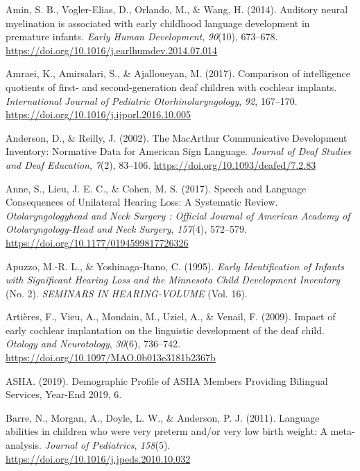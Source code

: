 \documentclass[english,man]{apa6}
\begin{document}
\leavevmode\hypertarget{ref-amin2014}{}%
Amin, S. B., Vogler-Elias, D., Orlando, M., \& Wang, H. (2014). Auditory neural myelination is associated with early childhood language development in premature infants. \emph{Early Human Development}, \emph{90}(10), 673--678. \url{https://doi.org/10.1016/j.earlhumdev.2014.07.014}

\leavevmode\hypertarget{ref-amraei2017}{}%
Amraei, K., Amirsalari, S., \& Ajalloueyan, M. (2017). Comparison of intelligence quotients of first- and second-generation deaf children with cochlear implants. \emph{International Journal of Pediatric Otorhinolaryngology}, \emph{92}, 167--170. \url{https://doi.org/10.1016/j.ijporl.2016.10.005}

\leavevmode\hypertarget{ref-anderson2002}{}%
Anderson, D., \& Reilly, J. (2002). The MacArthur Communicative Development Inventory: Normative Data for American Sign Language. \emph{Journal of Deaf Studies and Deaf Education}, \emph{7}(2), 83--106. \url{https://doi.org/10.1093/deafed/7.2.83}

\leavevmode\hypertarget{ref-anne2017}{}%
Anne, S., Lieu, J. E. C., \& Cohen, M. S. (2017). Speech and Language Consequences of Unilateral Hearing Loss: A Systematic Review. \emph{Otolaryngologyhead and Neck Surgery : Official Journal of American Academy of Otolaryngology-Head and Neck Surgery}, \emph{157}(4), 572--579. \url{https://doi.org/10.1177/0194599817726326}

\leavevmode\hypertarget{ref-apuzzo1995}{}%
Apuzzo, M.-R. L., \& Yoshinaga-Itano, C. (1995). \emph{Early Identification of Infants with Significant Hearing Loss and the Minnesota Child Development Inventory} (No. 2). \emph{SEMINARS IN HEARING-VOLUME} (Vol. 16).

\leavevmode\hypertarget{ref-artieres2009}{}%
Artières, F., Vieu, A., Mondain, M., Uziel, A., \& Venail, F. (2009). Impact of early cochlear implantation on the linguistic development of the deaf child. \emph{Otology and Neurotology}, \emph{30}(6), 736--742. \url{https://doi.org/10.1097/MAO.0b013e3181b2367b}

\leavevmode\hypertarget{ref-asha2019}{}%
ASHA. (2019). Demographic Profile of ASHA Members Providing Bilingual Services, Year-End 2019, 6.

\leavevmode\hypertarget{ref-barre2011}{}%
Barre, N., Morgan, A., Doyle, L. W., \& Anderson, P. J. (2011). Language abilities in children who were very preterm and/or very low birth weight: A meta-analysis. \emph{Journal of Pediatrics}, \emph{158}(5). \url{https://doi.org/10.1016/j.jpeds.2010.10.032}
\end{document}

